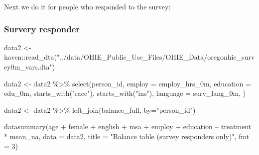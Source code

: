\documentclass[
  letterpaper,
  DIV=11,
  numbers=noendperiod]{scrartcl}
\newenvironment{Shaded}{\begin{snugshade}}{\end{snugshade}}
\newcommand{\AttributeTok}[1]{\textcolor[rgb]{0.40,0.45,0.13}{#1}}
\newcommand{\DecValTok}[1]{\textcolor[rgb]{0.68,0.00,0.00}{#1}}
\newcommand{\FunctionTok}[1]{\textcolor[rgb]{0.28,0.35,0.67}{#1}}
\newcommand{\NormalTok}[1]{\textcolor[rgb]{0.00,0.23,0.31}{#1}}
\newcommand{\OtherTok}[1]{\textcolor[rgb]{0.00,0.23,0.31}{#1}}
\newcommand{\SpecialCharTok}[1]{\textcolor[rgb]{0.37,0.37,0.37}{#1}}
\newcommand{\StringTok}[1]{\textcolor[rgb]{0.13,0.47,0.30}{#1}}
\begin{document}
Next we do it for people who responded to the survey:

\subsubsection{Survery responder}\label{survery-responder}

\begin{Shaded}
\begin{Highlighting}[]
\NormalTok{data2 }\OtherTok{\textless{}{-}}\NormalTok{ haven}\SpecialCharTok{::}\FunctionTok{read\_dta}\NormalTok{(}\StringTok{"../data/OHIE\_Public\_Use\_Files/OHIE\_Data/oregonhie\_survey0m\_vars.dta"}\NormalTok{)}

\NormalTok{data2 }\OtherTok{\textless{}{-}}\NormalTok{ data2 }\SpecialCharTok{\%\textgreater{}\%} 
  \FunctionTok{select}\NormalTok{(person\_id, }\AttributeTok{employ =}\NormalTok{ employ\_hrs\_0m, }\AttributeTok{education =}\NormalTok{ edu\_0m, }\FunctionTok{starts\_with}\NormalTok{(}\StringTok{"race"}\NormalTok{), }\FunctionTok{starts\_with}\NormalTok{(}\StringTok{"ins"}\NormalTok{), }\AttributeTok{language =}\NormalTok{ surv\_lang\_0m, )}

\NormalTok{data2 }\OtherTok{\textless{}{-}}\NormalTok{ data2 }\SpecialCharTok{\%\textgreater{}\%} 
  \FunctionTok{left\_join}\NormalTok{(balance\_full, }\AttributeTok{by=}\StringTok{"person\_id"}\NormalTok{)}


\FunctionTok{datasummary}\NormalTok{(age }\SpecialCharTok{+}\NormalTok{ female }\SpecialCharTok{+}\NormalTok{ english }\SpecialCharTok{+}\NormalTok{ msa }\SpecialCharTok{+}\NormalTok{ employ }\SpecialCharTok{+}\NormalTok{ education }\SpecialCharTok{\textasciitilde{}}\NormalTok{ treatment }\SpecialCharTok{*}\NormalTok{ mean\_na,}
  \AttributeTok{data =}\NormalTok{ data2,}
  \AttributeTok{title =} \StringTok{"Balance table (survey responders only)"}\NormalTok{,}
  \AttributeTok{fmt =} \DecValTok{3}\NormalTok{)}
\end{Highlighting}
\end{Shaded}
\end{document}
